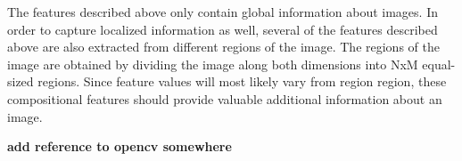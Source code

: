 The features described above only contain global information about images. In order to capture localized information as well, several of the features described above are also extracted from different regions of the image. The regions of the image are obtained by dividing the image along both dimensions into NxM equal-sized regions. Since feature values will most likely vary from region region, these compositional features should provide valuable additional information about an image. 

\textbf{add reference to opencv somewhere}



